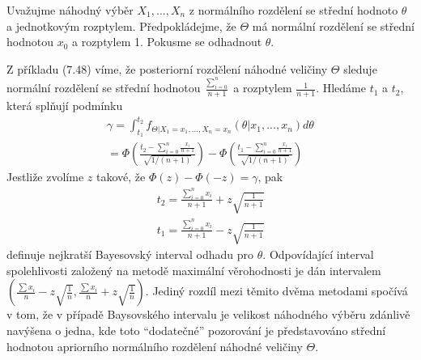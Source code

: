 \begin{example}
Uvažujme náhodný výběr $X_1, ..., X_n$ z normálního rozdělení se střední hodnoto $\theta$ a jednotkovým rozptylem. Předpokládejme, že $\Theta$ má normální rozdělení se střední hodnotou $x_0$ a rozptylem 1. Pokusme se odhadnout $\theta$.

Z příkladu (7.48) víme, že posteriorní rozdělení náhodné veličiny $\Theta$ sleduje normální rozdělení se střední hodnotou $\frac{\sum_{i = 0}^n}{n + 1}$ a rozptylem $\frac{1}{n + 1}$. Hledáme $t_1$ a $t_2$, která splňují podmínku
\begin{gather*}
\gamma = \int_{t_1}^{t_2} f_{\Theta|X_1 = x_1, ..., X_n = x_n}(\theta|x_1, ..., x_n)d\theta\\
= \Phi\left(\frac{t_2 - \sum_{i = 0}^n \frac{x_i}{n + 1}}{\sqrt{1 / (n + 1)}}\right) - \Phi\left(\frac{t_1 - \sum_{i = 0}^n \frac{x_i}{n + 1}}{\sqrt{1 / (n + 1)}}\right)
\end{gather*}
Jestliže zvolíme $z$ takové, že $\Phi(z) - \Phi(-z) = \gamma$, pak
\begin{gather*}
t_2 = \frac{\sum_{i = 0}^n x_i}{n + 1} + z\sqrt{\frac{1}{n + 1}}\\
t_1 = \frac{\sum_{i = 0}^n x_i}{n + 1} - z\sqrt{\frac{1}{n + 1}}
\end{gather*}
definuje nejkratší Bayesovský interval odhadu pro $\theta$. Odpovídající interval spolehlivosti založený na metodě maximální věrohodnosti je dán intervalem $\left(\frac{\sum x_i}{n} - z\sqrt{\frac{1}{n}}, \frac{\sum x_i}{n} + z\sqrt{\frac{1}{n}} \right)$. Jediný rozdíl mezi těmito dvěma metodami spočívá v tom, že v případě Baysovského intervalu je velikost náhodného výběru zdánlivě navýšena o jedna, kde toto ``dodatečné'' pozorování je představováno střední hodnotou apriorního normálního rozdělení náhodné veličiny $\Theta$. 
\end{example}
